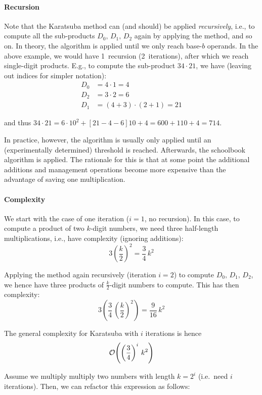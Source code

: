 \paragraph{Recursion}
Note that the Karatsuba method can (and should) be applied \emph{recursively}, i.e., to compute all the sub-products $D_0,\, D_1,\,D_2$ again by applying the method, and so on. In theory, the algorithm is applied until we only reach base-$b$ operands. In the above example, we would have 1~recursion (2~iterations), after which we reach single-digit products. E.g., to compute the sub-product $34 \cdot 21$, we have (leaving out indices for simpler notation):
\begin{align}
	D_0 &= 4 \cdot 1 = 4 \nonumber \\ 
	D_2 &= 3 \cdot 2 = 6 \nonumber \\ 
	D_1 &= \left(4 + 3\right) \cdot \left(2 + 1\right) = 21 \nonumber
\end{align}

and thus $34 \cdot 21 = 6\cdot 10^2 + \left[21 - 4 - 6\right] 10 + 4 = 600 + 110 + 4 = 714$.

In practice, however, the algorithm is usually only applied until an (experimentally determined) threshold is reached. Afterwards, the schoolbook algorithm is applied. The rationale for this is that at some point the additional additions and management operations become more expensive than the advantage of saving one multiplication.

\paragraph{Complexity}
We start with the case of one iteration ($i = 1$, no recursion). In this case, to compute a product of two $k$-digit numbers, we need three half-length multiplications, i.e., have complexity (ignoring additions):
$$3 \left(\frac{k}{2}\right)^2 = \frac{3}{4}\, k^2$$

Applying the method again recursively (iteration $i = 2$) to compute $D_0,\, D_1,\,D_2$, we hence have three products of $\frac{k}{2}$-digit numbers to compute. This has then complexity:
$$3 \left(\frac{3}{4}\, \left(\frac{k}{2}\right)^2\right) = \frac{9}{16}\,k^2$$

The general complexity for Karatsuba with $i$ iterations is hence 
$$
\mathcal{O}{\left( \left(\frac{3}{4}\right)^i\,k^2\right)}
$$

Assume we multiply multiply two numbers with length $k = 2^i$ (i.e.~need $i$ iterations). Then, we can refactor this expression as follows:

